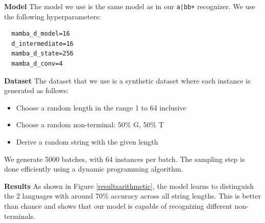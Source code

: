 \textbf{Model}
The model we use is the same model as in our \texttt{a|bb+} recognizer. We use
the following hyperparameters:
\begin{verbatim}
  mamba_d_model=16
  d_intermediate=16
  mamba_d_state=256
  mamba_d_conv=4
\end{verbatim}

\textbf{Dataset}
The dataset that we use is a synthetic dataset where each instance is generated
as follows:
\begin{itemize}
    \item Choose a random length in the range 1 to 64 inclusive
    \item Choose a random non-terminal: 50\% G, 50\% T
    \item Derive a random string with the given length
\end{itemize}
We generate 5000 batches, with 64 instances per batch.
The sampling step is done efficiently using a dynamic programming algorithm.

\textbf{Results}
As shown in Figure \ref{resultsarithmetic}, the model learns to distinguish the
2 languages with around 70\% accuracy across all string lengths. This is better
than chance and shows that our model is capable of recognizing different
non-terminals.

